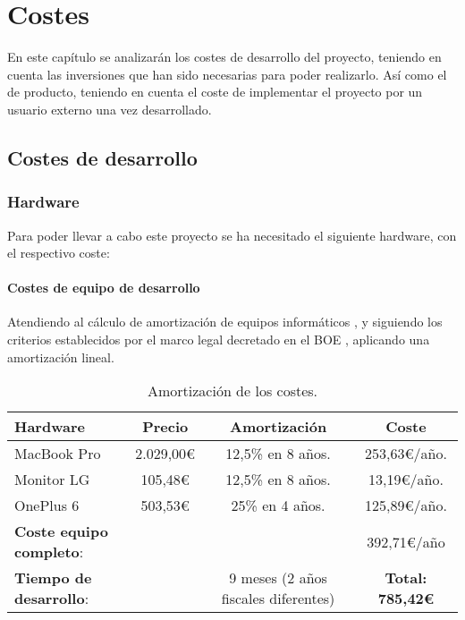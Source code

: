 \chapter{Costes}
En este capítulo se analizarán los costes de desarrollo del proyecto, teniendo
en cuenta las inversiones que han sido necesarias para poder realizarlo. Así
como el de producto, teniendo en cuenta el coste de implementar el
proyecto por un usuario externo una vez desarrollado.

\section{Costes de desarrollo}

\subsection{Hardware}

Para poder llevar a cabo este proyecto se ha necesitado el siguiente hardware,
con el respectivo coste:

\subsubsection{Costes de equipo de desarrollo}

Atendiendo al cálculo de amortización de equipos informáticos
\cite{costes-explicacion}, y siguiendo los criterios establecidos por el marco
legal decretado en el BOE \cite{costes-boe}, aplicando una amortización lineal.

\begin{table}[H]
    \begin{center}
    \begin{tabular}{| l | c | c | c |}
        \hline
        \textbf{Hardware} & \textbf{Precio} & \textbf{Amortización} & \textbf{Coste} \\ \hline
        MacBook Pro & 2.029,00\euro & 12,5\% en 8 años. & 253,63\euro/año.\\
        Monitor LG & 105,48\euro & 12,5\% en 8 años. & 13,19\euro/año.\\
        OnePlus 6 & 503,53\euro & 25\% en 4 años. & 125,89\euro/año.\\ \hline
        \textbf{Coste equipo completo}: & & & 392,71\euro/año \\ \hline
        \textbf{Tiempo de desarrollo}: & & 9 meses (2 años fiscales diferentes) & \textbf{Total: 785,42\euro} \\ \hline
    \end{tabular}
    \caption{Amortización de los costes.}
    \label{tab:costes-hardware-desarrollo}
    \end{center}
\end{table} 

